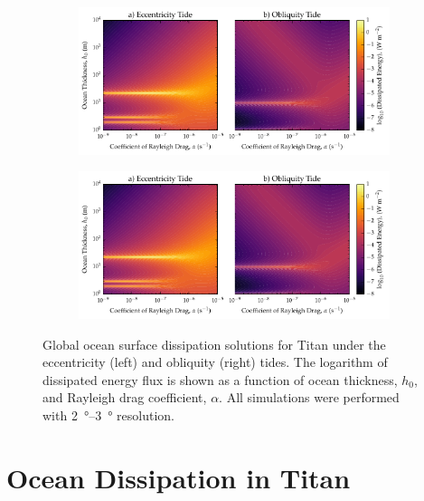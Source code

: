 \begin{figure}[!t]
    \centering
    \begin{subfigure}[t]{0.95\linewidth} %
        \includegraphics[width=\linewidth]{Figures/titan_linear}
        \label{fig:lincEccTitan}
    \end{subfigure}
    \begin{subfigure}[t]{0\linewidth} %
         \includegraphics[width=\linewidth]{Figures/titan_linear}
         \label{fig:linObliqTitan}   
    \end{subfigure}
    \vspace{-0.5cm}
\caption{Global ocean surface dissipation solutions for Titan under the eccentricity (left) and obliquity (right) tides. The logarithm of dissipated energy flux is shown as a function of ocean thickness, $h_0$, and Rayleigh drag coefficient, $\alpha$. All simulations were performed with \SIrange{2}{3}{\degree} resolution.}
\label{fig:linTitan}
\end{figure}

\section{Ocean Dissipation in Titan \label{sec:results_Titan}}

